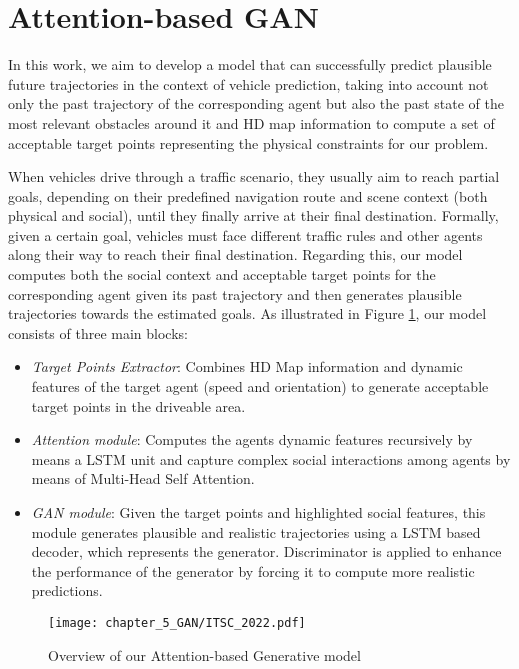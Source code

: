 \section{Attention-based GAN}
\label{sec:5_attention_gan}

In this work, we aim to develop a model \cite{gomez2022exploring} that can successfully predict plausible future trajectories in the context of vehicle prediction, taking into account not only the past trajectory of the corresponding agent but also the past state of the most relevant obstacles around it and HD map information to compute a set of acceptable target points representing the physical constraints for our problem.

When vehicles drive through a traffic scenario, they usually aim to reach partial goals, depending on their predefined navigation route and scene context (both physical and social), until they finally arrive at their final destination. Formally, given a certain goal, vehicles must face different traffic rules and other agents along their way to reach their final destination. Regarding this, our model computes both the social context and acceptable target points for the corresponding agent given its past trajectory and then generates plausible trajectories towards the estimated goals. As illustrated in Figure \ref{fig:chapter_5_GAN/ITSC_2022}, our model consists of three main blocks:

\begin{itemize}
	\item \textit{Target Points Extractor}: Combines HD Map information and dynamic features of the target agent (speed and orientation) to generate acceptable target points in the driveable area.
	\item \textit{Attention module}: Computes the agents dynamic features recursively by means a \ac{LSTM} unit and capture complex social interactions among agents by means of Multi-Head Self Attention.
	\item \textit{GAN module}: Given the target points and highlighted social features, this module generates plausible and realistic trajectories using a LSTM based decoder, which represents the generator. Discriminator is applied to enhance the performance of the generator by forcing it to compute more realistic predictions.
\end{itemize} 

\begin{figure}[h] 
	\centering
	\texttt{[image: chapter\_5\_GAN/ITSC\_2022.pdf]}
	\caption{Overview of our Attention-based Generative model}
	\label{fig:chapter_5_GAN/ITSC_2022}
\end{figure}

